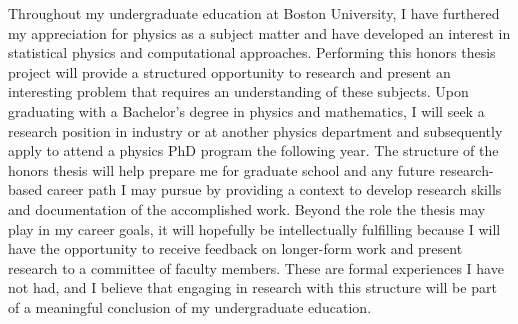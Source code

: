 \documentclass[letterpaper,12pt]{article}
\begin{document}
Throughout my undergraduate education at Boston University, I have furthered my appreciation for physics as a subject matter and have developed an interest in statistical physics and computational approaches.
Performing this honors thesis project will provide a structured opportunity to research and present an interesting problem that requires an understanding of these subjects.
Upon graduating with a Bachelor's degree in physics and mathematics, I will seek a research position in industry or at another physics department and subsequently apply to attend a physics PhD program the following year.
The structure of the honors thesis will help prepare me for graduate school and any future research-based career path I may pursue by providing a context to develop research skills and documentation of the accomplished work.
Beyond the role the thesis may play in my career goals, it will hopefully be intellectually fulfilling because I will have the opportunity to receive feedback on longer-form work and present research to a committee of faculty members.
These are formal experiences I have not had, and I believe that engaging in research with this structure will be part of a meaningful conclusion of my undergraduate education.










\end{document}
